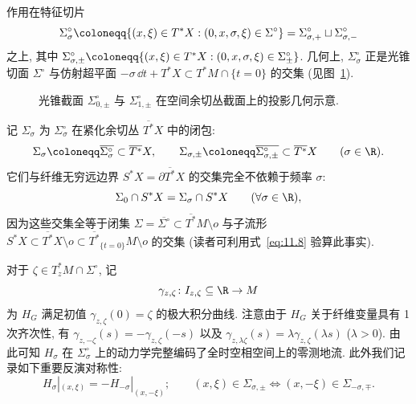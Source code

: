作用在特征切片
\begin{equation}\label{eq:11.12}
    \Sigma_\sigma^\circ \defeq \{(x, \xi) \in T^* X : (0, x, \sigma, \xi) \in \Sigma^\circ\} = \Sigma_{\sigma, +}^\circ \sqcup \Sigma_{\sigma, -}^\circ
\end{equation}
之上, 其中 $\Sigma_{\sigma, \pm}^\circ \defeq \{(x, \xi) \in T^* X : (0, x, \sigma, \xi) \in \Sigma_\pm^\circ\}$. 几何上, $\Sigma_\sigma^\circ$ 正是光锥切面 $\Sigma^\circ$ 与仿射超平面 $-\sigma \,\dd t + T^* X \subset T^* M \cap \{t = 0\}$ 的交集 (见图~\ref{fig:11.2}).

\begin{figure}[htbp]
\centering
\drawFigElevenTwo
\caption{光锥截面 $\Sigma_{0, \pm}^\circ$ 与 $\Sigma_{1, \pm}^\circ$ 在空间余切丛截面上的投影几何示意.}\label{fig:11.2}
\end{figure}

记 $\Sigma_\sigma$ 为 $\Sigma_\sigma^\circ$ 在紧化余切丛 $\overline{T^*} X$ 中的闭包:
\begin{equation}\label{eq:11.13}
    \Sigma_\sigma \defeq \overline{\Sigma_\sigma^\circ} \subset \overline{T^*} X, \qquad \Sigma_{\sigma, \pm} \defeq \overline{\Sigma_{\sigma, \pm}^\circ} \subset \overline{T^*} X \qquad (\sigma \in \R).
\end{equation}
它们与纤维无穷远边界 $S^* X = \partial \overline{T^*} X$ 的交集完全不依赖于频率 $\sigma$:
\begin{equation}\label{eq:11.14}
    \Sigma_0 \cap S^* X = \Sigma_\sigma \cap S^* X \qquad (\forall \sigma \in \R),
\end{equation}
因为这些交集全等于闭集 $\Sigma = \overline{\Sigma^\circ} \subset \overline{T^*} M \setminus o$ 与子流形 $S^* X \subset \overline{T^*} X \setminus o \subset \overline{T^*}_{\{t=0\}} M \setminus o$ 的交集 (读者可利用式~\eqref{eq:11.8} 验算此事实).

对于 $\zeta \in T_z^* M \cap \Sigma^\circ$, 记
\begin{equation}\label{eq:11.15}
    \gamma_{z, \zeta} \colon I_{z, \zeta} \subseteq \R \to M
\end{equation}
为 $H_G$ 满足初值 $\gamma_{z, \zeta}(0) = \zeta$ 的极大积分曲线. 注意由于 $H_G$ 关于纤维变量具有 1 次齐次性, 有 $\gamma_{z, -\zeta}(s) = -\gamma_{z, \zeta}(-s)$ 以及 $\gamma_{z, \lambda\zeta}(s) = \lambda \gamma_{z, \zeta}(\lambda s)$ ($\lambda > 0$). 由此可知 $H_\sigma$ 在 $\Sigma_\sigma^\circ$ 上的动力学完整编码了全时空相空间上的零测地流. 此外我们记录如下重要反演对称性:
\begin{equation}\label{eq:11.16}
    H_\sigma|_{(x, \xi)} = -H_{-\sigma}|_{(x, -\xi)}; \qquad (x, \xi) \in \Sigma_{\sigma, \pm} \iff (x, -\xi) \in \Sigma_{-\sigma, \mp}.
\end{equation}

